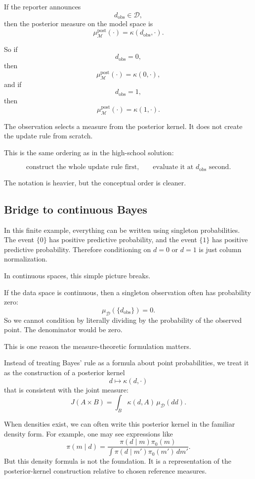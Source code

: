 \documentclass[11pt]{article}
\newcommand{\M}{\mathcal{M}}
\newcommand{\D}{\mathcal{D}}
\newcommand{\muD}{\mu_{\D}}
\newcommand{\dobs}{d_{\mathrm{obs}}}
\begin{document}
If the reporter announces
\[
    \dobs\in\D,
\]
then the posterior measure on the model space is
\[
    \mu^{\mathrm{post}}_{\M}(\cdot)
    =
    \kappa(\dobs,\cdot).
\]

So if
\[
    \dobs=0,
\]
then
\[
    \mu^{\mathrm{post}}_{\M}(\cdot)
    =
    \kappa(0,\cdot),
\]
and if
\[
    \dobs=1,
\]
then
\[
    \mu^{\mathrm{post}}_{\M}(\cdot)
    =
    \kappa(1,\cdot).
\]

The observation selects a measure from the posterior kernel. It does not create the update rule from scratch.

This is the same ordering as in the high-school solution:

\[
    \text{construct the whole update rule first,}
    \qquad
    \text{evaluate it at }\dobs\text{ second.}
\]

The notation is heavier, but the conceptual order is cleaner.

\subsection{Bridge to continuous Bayes}

In this finite example, everything can be written using singleton probabilities. The event \(\{0\}\) has positive predictive probability, and the event \(\{1\}\) has positive predictive probability. Therefore conditioning on \(d=0\) or \(d=1\) is just column normalization.

In continuous spaces, this simple picture breaks.

If the data space is continuous, then a singleton observation often has probability zero:
\[
    \muD(\{\dobs\})=0.
\]
So we cannot condition by literally dividing by the probability of the observed point. The denominator would be zero.

This is one reason the measure-theoretic formulation matters.

Instead of treating Bayes' rule as a formula about point probabilities, we treat it as the construction of a posterior kernel
\[
    d\longmapsto \kappa(d,\cdot)
\]
that is consistent with the joint measure:
\[
    J(A\times B)
    =
    \int_B \kappa(d,A)\,\muD(dd).
\]

When densities exist, we can often write this posterior kernel in the familiar density form. For example, one may see expressions like
\[
    \pi(m\mid d)
    =
    \frac{\pi(d\mid m)\pi_0(m)}
    {\int \pi(d\mid m')\pi_0(m')\,dm'}.
\]
But this density formula is not the foundation. It is a representation of the posterior-kernel construction relative to chosen reference measures.
\end{document}

